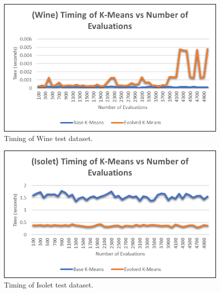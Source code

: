 \documentclass[conference]{IEEEtran}
\begin{document}
\begin{figure}[H]
\begin{center}
\includegraphics[width=0.7\columnwidth]{winetiming.png}
\caption{Timing of Wine test dataset.}
\end{center}
\label{fig}
\end{figure}

\begin{figure}[H]
\begin{center}
\includegraphics[width=0.7\columnwidth]{isolettiming.png}
\caption{Timing of Isolet test dataset.}
\end{center}
\label{fig}
\end{figure}
\end{document}
